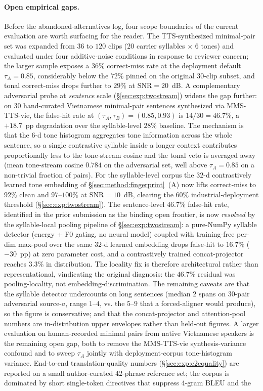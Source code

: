 \documentclass[a4paper,fleqn]{cas-dc}
\begin{document}
\paragraph{Open empirical gaps.} Before the abandoned-alternatives log, four scope boundaries of the current evaluation are worth surfacing for the reader. The TTS-synthesized minimal-pair set was expanded from $36$ to $120$ clips ($20$ carrier syllables $\times$ $6$ tones) and evaluated under four additive-noise conditions in response to reviewer concern; the larger sample exposes a $36\%$ correct-miss rate at the deployment default $\tau_{A}=0.85$, considerably below the $72\%$ pinned on the original $30$-clip subset, and tonal correct-miss drops further to $29\%$ at $\mathrm{SNR}=20$~dB. A complementary adversarial probe at \emph{sentence} scale (\S\ref{sec:exp:twostream}) widens the gap further: on $30$ hand-curated Vietnamese minimal-pair sentences synthesized via MMS-TTS-vie, the false-hit rate at $(\tau_{A}, \tau_{B}) = (0.85, 0.93)$ is $14/30 = 46.7\%$, a $+18.7$~pp degradation over the syllable-level $28\%$ baseline. The mechanism is that the 6-d tone histogram aggregates tone information across the whole sentence, so a single contrastive syllable inside a longer context contributes proportionally less to the tone-stream cosine and the tonal veto is averaged away (mean tone-stream cosine $0.784$ on the adversarial set, well above $\tau_{A} = 0.85$ on a non-trivial fraction of pairs). For the syllable-level corpus the $32$-d contrastively learned tone embedding of \S\ref{sec:method:fingerprint}~(A) now lifts correct-miss to $92\%$ clean and $97$--$100\%$ at $\mathrm{SNR}=10$~dB, clearing the $60\%$ industrial-deployment threshold (\S\ref{sec:exp:twostream}). The sentence-level $46.7\%$ false-hit rate, identified in the prior submission as the binding open frontier, is now \emph{resolved} by the syllable-local pooling pipeline of \S\ref{sec:exp:twostream}: a pure-NumPy syllable detector (energy + F0 gating, no neural model) coupled with training-free per-dim max-pool over the same $32$-d learned embedding drops false-hit to $\mathbf{16.7\%}$ ($-30$~pp) at zero parameter cost, and a contrastively trained concat-projector reaches $\mathbf{3.3\%}$ in distribution. The locality fix is therefore architectural rather than representational, vindicating the original diagnosis: the $46.7\%$ residual was pooling-locality, not embedding-discrimination. The remaining caveats are that the syllable detector undercounts on long sentences (median $2$ spans on $30$-pair adversarial source-$a$, range $1$--$4$, vs. the $5$--$9$ that a forced-aligner would produce), so the figure is conservative; and that the concat-projector and attention-pool numbers are in-distribution upper envelopes rather than held-out figures. A larger evaluation on human-recorded minimal pairs from native Vietnamese speakers is the remaining open gap, both to remove the MMS-TTS-vie synthesis-variance confound and to sweep $\tau_{A}$ jointly with deployment-corpus tone-histogram variance. End-to-end translation-quality numbers (\S\ref{sec:exp:e2equality}) are reported on a small author-curated $42$-phrase reference set; the corpus is dominated by short single-token directives that suppress 4-gram BLEU and the 
\end{document}
